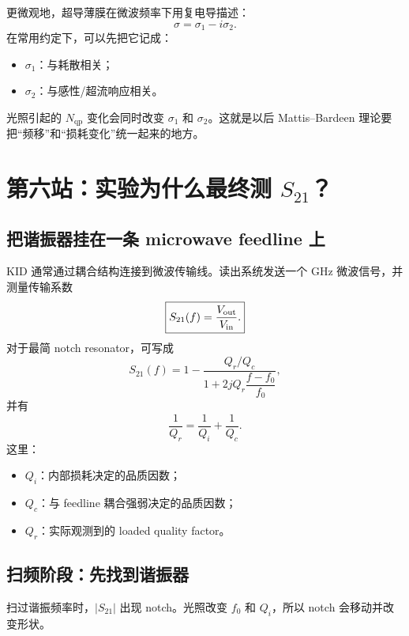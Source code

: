 \documentclass[11pt,a4paper,openany]{ctexrep}
\newcommand{\qp}{\mathrm{qp}}
\begin{document}
更微观地，超导薄膜在微波频率下用复电导描述：
\[
\boxed{\sigma=\sigma_1-i\sigma_2.}
\]
在常用约定下，可以先把它记成：
\begin{itemize}
  \item $\sigma_1$：与耗散相关；
  \item $\sigma_2$：与感性/超流响应相关。
\end{itemize}
光照引起的 $N_{\qp}$ 变化会同时改变 $\sigma_1$ 和 $\sigma_2$。这就是以后 Mattis--Bardeen 理论要把“频移”和“损耗变化”统一起来的地方。

\section{第六站：实验为什么最终测 $S_{21}$？}

\subsection{把谐振器挂在一条 microwave feedline 上}
KID 通常通过耦合结构连接到微波传输线。读出系统发送一个 GHz 微波信号，并测量传输系数
\[
\boxed{S_{21}(f)=\frac{V_{\rm out}}{V_{\rm in}}.}
\]
对于最简 notch resonator，可写成
\[
S_{21}(f)=1-\frac{Q_r/Q_c}{1+2jQ_r\dfrac{f-f_0}{f_0}},
\]
并有
\[
\boxed{\frac{1}{Q_r}=\frac{1}{Q_i}+\frac{1}{Q_c}.}
\]
这里：
\begin{itemize}
  \item $Q_i$：内部损耗决定的品质因数；
  \item $Q_c$：与 feedline 耦合强弱决定的品质因数；
  \item $Q_r$：实际观测到的 loaded quality factor。
\end{itemize}

\subsection{扫频阶段：先找到谐振器}
扫过谐振频率时，$|S_{21}|$ 出现 notch。光照改变 $f_0$ 和 $Q_i$，所以 notch 会移动并改变形状。

\begin{center}
\end{center}
\end{document}
